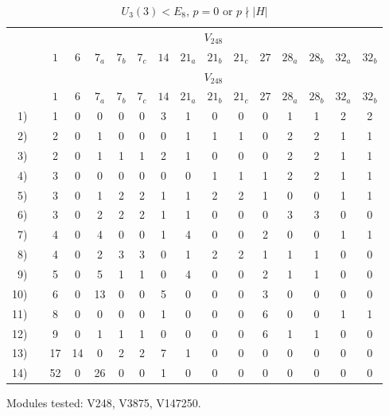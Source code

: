 \setcounter{table}{329}
\begin{longtable}{rc|cccccccccccccc}
\caption{$U_3(3) < E_8$, $p = 0$ or $p \nmid |H|$}\\
& & \multicolumn{14}{c}{$V_{248}$} \\
& & $1$ & $6$ & $7_{a}$ & $7_{b}$ & $7_{c}$ & $14$ & $21_{a}$ & $21_{b}$ & $21_{c}$ & $27$ & $28_{a}$ & $28_{b}$ & $32_{a}$ & $32_{b}$ \\ \hline
\endfirsthead
& & \multicolumn{14}{c}{$V_{248}$} \\
& & $1$ & $6$ & $7_{a}$ & $7_{b}$ & $7_{c}$ & $14$ & $21_{a}$ & $21_{b}$ & $21_{c}$ & $27$ & $28_{a}$ & $28_{b}$ & $32_{a}$ & $32_{b}$ \\ \hline
\endhead
1) &  & 1 & 0 & 0 & 0 & 0 & 3 & 1 & 0 & 0 & 0 & 1 & 1 & 2 & 2 \\
2) &  & 2 & 0 & 1 & 0 & 0 & 0 & 1 & 1 & 1 & 0 & 2 & 2 & 1 & 1 \\
3) &  & 2 & 0 & 1 & 1 & 1 & 2 & 1 & 0 & 0 & 0 & 2 & 2 & 1 & 1 \\
4) &  & 3 & 0 & 0 & 0 & 0 & 0 & 0 & 1 & 1 & 1 & 2 & 2 & 1 & 1 \\
5) &  & 3 & 0 & 1 & 2 & 2 & 1 & 1 & 2 & 2 & 1 & 0 & 0 & 1 & 1 \\
6) &  & 3 & 0 & 2 & 2 & 2 & 1 & 1 & 0 & 0 & 0 & 3 & 3 & 0 & 0 \\
7) &  & 4 & 0 & 4 & 0 & 0 & 1 & 4 & 0 & 0 & 2 & 0 & 0 & 1 & 1 \\
8) &  & 4 & 0 & 2 & 3 & 3 & 0 & 1 & 2 & 2 & 1 & 1 & 1 & 0 & 0 \\
9) &  & 5 & 0 & 5 & 1 & 1 & 0 & 4 & 0 & 0 & 2 & 1 & 1 & 0 & 0 \\
10) &  & 6 & 0 & 13 & 0 & 0 & 5 & 0 & 0 & 0 & 3 & 0 & 0 & 0 & 0 \\
11) &  & 8 & 0 & 0 & 0 & 0 & 1 & 0 & 0 & 0 & 6 & 0 & 0 & 1 & 1 \\
12) &  & 9 & 0 & 1 & 1 & 1 & 0 & 0 & 0 & 0 & 6 & 1 & 1 & 0 & 0 \\
13) &  & 17 & 14 & 0 & 2 & 2 & 7 & 1 & 0 & 0 & 0 & 0 & 0 & 0 & 0 \\
14) &  & 52 & 0 & 26 & 0 & 0 & 1 & 0 & 0 & 0 & 0 & 0 & 0 & 0 & 0 \\
\end{longtable}
\noindent Modules tested: V248, V3875, V147250.\\

